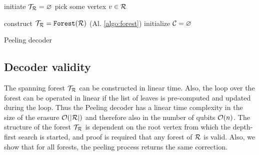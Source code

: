 \begin{algorithm}[htb]
  \BlankLine
  \BlankLine
  initiate $\mathcal{T}_{\mathcal{R}} = \varnothing$ \;
  pick some vertex $v \in \mathcal{R}$ \;
  \BlankLine
  \caption{}\label{algo:forest}
\end{algorithm}



\begin{algorithm}[htb]
  \BlankLine
  \BlankLine
  construct $\mathcal{T}_{\mathcal{R}} = \texttt{Forest}(\mathcal{R})$ (Al. \ref{algo:forest})\;
  initialize $\mathcal{C} = {\varnothing}$\;
  \BlankLine
  \caption{Peeling decoder \cite{delfosse2017linear}}\label{algo:peel}
\end{algorithm}

\subsection{Decoder validity}
The spanning forest $\mathcal{T}_{\mathcal{R}}$ can be constructed in linear time. Also, the loop over the forest can be operated in linear if the list of leaves is pre-computed and updated during the loop. Thus the Peeling decoder has a linear time complexity in the size of the erasure $\mathcal{O}(\abs{\mathcal{R}})$ and therefore also in the number of qubits $\mathcal{O}(n)$. The structure of the forest $\mathcal{T}_{\mathcal{R}}$ is dependent on the root vertex from which the depth-first search is started, and proof is required that any forest of $\mathcal{R}$ is valid. Also, we show that for all forests, the peeling process returns the same correction.

